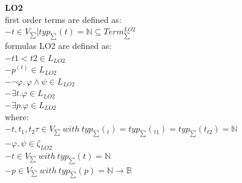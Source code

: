 \documentclass{article}
\begin{document}
\begin{multicols}{4}

\textbf{LO2} \\
first order terms are defined as: \\
$-{\textit{t} \in V_{\sum} | typ_{\sum}(\textit{t}) = \mathbb{N}} \subseteq Term _{\sum}^{LO2} $ \\
formulas LO2 are defined as: \\
$-t1 < t2 \in L_{LO2} $ \\
$-p^{(t)} \in L_{LO2}$ \\
$-\neg\varphi, \varphi \wedge \psi \in L_{LO2}$ \\
$-\exists t. \varphi \in L_{LO2} $ \\
$-\exists p. \varphi \in L_{LO2} $ \\
where: \\
$-t, t_{1}, t_{2}\tau \in V_{\sum} \ with \ typ_{\sum}(_{t}) = typ_{\sum}(_{t1}) = typ_{\sum}(t_{t2}) = \mathbb{N} $ \\
$-\varphi, \psi \in \zeta_{LO2} $ \\
$-t \in V_{\sum} \ with \ typ_{\sum}(t) = \mathbb{N}$ \\
$-p \in V_{\sum} \ with \ typ_{\sum}(p) = \mathbb{N} \rightarrow \mathbb{B}$ \\


\end{multicols}
\end{document}
